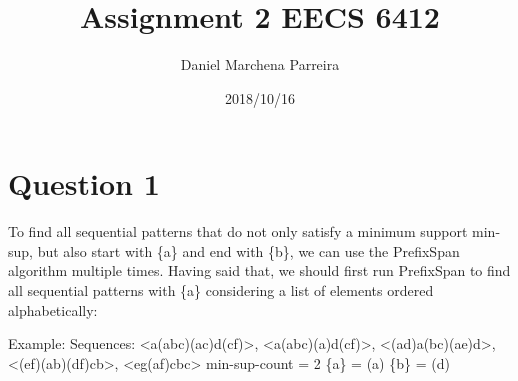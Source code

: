 \documentclass[a4paper]{article}
\title{Assignment 2 EECS 6412}
\author{Daniel Marchena Parreira}
\date{2018/10/16}
\begin{document}
\maketitle

\section*{Question 1}

To find all sequential patterns that do not only satisfy a minimum support min-sup, but also start with \{a\} and end with \{b\}, we can use the PrefixSpan algorithm multiple times. Having said that, we should first run PrefixSpan to find all sequential patterns with \{a\} considering a list of elements ordered alphabetically:

Example:
\newline
\newline
Sequences:
\textless a(abc)(ac)d(cf)\textgreater,
\textless a(abc)(a)d(cf)\textgreater,
\textless (ad)a(bc)(ae)d\textgreater,
\textless (ef)(ab)(df)cb\textgreater,
\textless eg(af)cbc\textgreater
\newline
min-sup-count = 2
\newline
\{a\} = (a)
\newline
\{b\} = (d)
\newline
\end{document}
